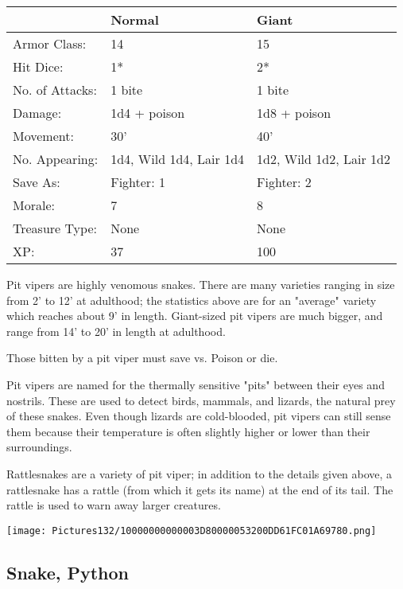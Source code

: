 \documentclass[a4paper,twoside,openany,10pt]{book}
\begin{document}
\begin{multicols}{2}
\begin{tabularx}{0.50\textwidth}{@{}XXX@{}}
& Normal & Giant \\\hline
Armor Class: & 14 & 15 \\\hline
Hit Dice: & 1* & 2* \\\hline
No. of Attacks: & 1 bite & 1 bite \\\hline
Damage: & 1d4 + poison & 1d8 + poison \\\hline
Movement: & 30' & 40' \\\hline
No. Appearing: & 1d4, Wild 1d4, Lair 1d4 & 1d2, Wild 1d2, Lair 1d2 \\\hline
Save As: & Fighter: 1 & Fighter: 2 \\\hline
Morale: & 7 & 8 \\\hline
Treasure Type: & None & None \\\hline
XP: & 37 & 100 \\\hline
\end{tabularx}

Pit vipers are highly venomous snakes. There are many varieties ranging in size from 2' to 12' at adulthood; the statistics above are for an "average" variety which reaches about 9' in length. Giant-sized pit vipers are much bigger, and range from 14' to 20' in length at adulthood.

Those bitten by a pit viper must save vs. Poison or die.

Pit vipers are named for the thermally sensitive "pits" between their eyes and nostrils. These are used to detect birds, mammals, and lizards, the natural prey of these snakes. Even though lizards are cold-blooded, pit vipers can still sense them because their temperature is often slightly higher or lower than their surroundings.

Rattlesnakes are a variety of pit viper; in addition to the details given above, a rattlesnake has a rattle (from which it gets its name) at the end of its tail. The rattle is used to warn away larger creatures. 


\begin{center} \texttt{[image: Pictures132/10000000000003D80000053200DD61FC01A69780.png]} \end{center}


\subsection*{Snake, Python}\label{snake-python}


\end{multicols}
\end{document}
